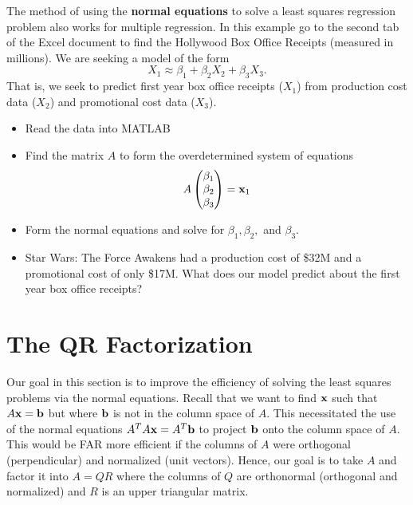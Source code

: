 \begin{problem}
    The method of using the {\bf normal equations} to solve a least squares regression
    problem also works for multiple regression.  In this example go to the second tab of
    the Excel document to find the Hollywood Box Office Receipts (measured in millions).
    We are seeking a model of the form
    \[ X_1  \approx \beta_1 + \beta_2 X_2 + \beta_3 X_3. \]
    That is, we seek to predict first year box office receipts ($X_1$) from production
    cost data ($X_2$) and promotional cost data ($X_3$).
    \begin{itemize}
        \item Read the data into MATLAB
        \item Find the matrix $A$ to form the overdetermined system of equations
            \[ A \begin{pmatrix} \beta_1 \\ \beta_2 \\ \beta_3 \end{pmatrix} =
                    {\bf x}_1 \]
        \item Form the normal equations and solve for $\beta_1, \beta_2,$ and $\beta_3$.  
        \item Star Wars: The Force Awakens had a production cost of \$32M and a
            promotional cost of only \$17M.  What does our model predict about the first
            year box office receipts?
    \end{itemize}
\end{problem}

% 
% 


\section{The QR Factorization}
Our goal in this section is to improve the efficiency of solving the least squares
problems via the normal equations.  Recall that we want to find ${\bf x}$ such that $A {\bf x} =
{\bf b}$ but where ${\bf b}$ is not in the column space of $A$.  This necessitated the use of the
normal equations $A^T A {\bf x} = A^T {\bf b}$ to project ${\bf b}$ onto the column space of $A$.
This would be FAR more efficient if the columns of $A$ were orthogonal (perpendicular) and
normalized (unit vectors).  Hence, our goal is to take $A$ and factor it into $A = QR$
where the columns of $Q$ are orthonormal (orthogonal and normalized) and $R$ is an upper
triangular matrix.

